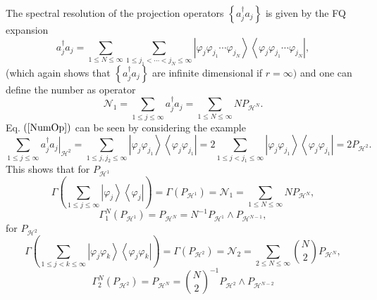 \documentclass[aps,preprint]{revtex4}%
\begin{document}
The spectral resolution of the projection operators $\left\{  a_{j}^{\dagger
}a_{j}\right\}  $ is given by the FQ expansion
\begin{equation}
a_{j}^{\dagger}a_{j}=\sum_{1\leq N\leq\infty}\sum_{1\leq j_{1}<\cdots
<j_{N}\leq\infty}\left\vert \varphi_{j}\varphi_{j_{1}}\cdots\varphi_{j_{N}%
}\right\rangle \left\langle \varphi_{j}\varphi_{j_{1}}\cdots\varphi_{j_{N}%
}\right\vert ,\label{OccNumOp}%
\end{equation}
(which again shows that $\left\{  a_{j}^{\dagger}a_{j}\right\}  $ are infinite
dimensional if $r=\infty)$ and one can define the number as operator
\begin{equation}
\mathcal{N}_{1}=\sum_{1\leq j\leq\infty}a_{j}^{\dagger}a_{j}=\sum_{1\leq
N\leq\infty}NP_{\mathcal{H}^{N}}.\label{NumOp}%
\end{equation}
Eq. $\left(  \ref{NumOp}\right)  $ can be seen by considering the example%
\begin{equation}
\sum_{1\leq j\leq\infty}\left.  a_{j}^{\dagger}a_{j}\right\vert _{\mathcal{H}%
^{2}}=\sum_{1\leq j,j_{2}\leq\infty}\left\vert \varphi_{j}\varphi_{j_{1}%
}\right\rangle \left\langle \varphi_{j}\varphi_{j_{1}}\right\vert
=2\sum_{1\leq j<j_{1}\leq\infty}\left\vert \varphi_{j}\varphi_{j_{1}%
}\right\rangle \left\langle \varphi_{j}\varphi_{j_{1}}\right\vert
=2P_{\mathcal{H}^{2}}.
\end{equation}
This shows that for $P_{\mathcal{H}^{1}}$
\begin{equation}
\Gamma\left(  \sum_{1\leq j\leq\infty}\left\vert \varphi_{j}\right\rangle
\left\langle \varphi_{j}\right\vert \right)  =\Gamma\left(  P_{\mathcal{H}%
^{1}}\right)  =\mathcal{N}_{1}=\sum_{1\leq N\leq\infty}NP_{\mathcal{H}^{N}},
\end{equation}%
\begin{equation}
\Gamma_{1}^{N}\left(  P_{\mathcal{H}^{1}}\right)  =P_{\mathcal{H}^{N}}%
=N^{-1}P_{\mathcal{H}^{1}}\wedge P_{\mathcal{H}^{N-1}},
\end{equation}
for $P_{\mathcal{H}^{2}}$
\begin{equation}
\Gamma\left(  \sum_{1\leq j<k\leq\infty}\left\vert \varphi_{j}\varphi
_{k}\right\rangle \left\langle \varphi_{j}\varphi_{k}\right\vert \right)
=\Gamma\left(  P_{\mathcal{H}^{2}}\right)  =\mathcal{N}_{2}=\sum_{2\leq
N\leq\infty}\binom{N}{2}P_{\mathcal{H}^{N}},
\end{equation}%
\begin{equation}
\Gamma_{2}^{N}\left(  P_{\mathcal{H}^{2}}\right)  =P_{\mathcal{H}^{N}}%
=\binom{N}{2}^{-1}P_{\mathcal{H}^{2}}\wedge P_{\mathcal{H}^{N-2}}%
\end{equation}
\end{document}
